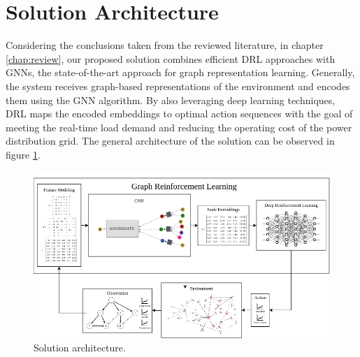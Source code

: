 \section{Solution Architecture} \label{sec:method-arch}

Considering the conclusions taken from the reviewed literature, in chapter \ref{chap:review}, our proposed solution combines efficient \acf{DRL} approaches with \acfp{GNN}, the state-of-the-art approach for graph representation learning. Generally, the system receives graph-based representations of the environment and encodes them using the \ac{GNN} algorithm. By also leveraging deep learning techniques, \ac{DRL} maps the encoded embeddings to optimal action sequences with the goal of meeting the real-time load demand and reducing the operating cost of the power distribution grid. The general architecture of the solution can be observed in figure \ref{fig:arch}.

\begin{figure}[H]
	\centering
	\includegraphics[width=0.85\linewidth]{./figures/arch.png}
	\caption{Solution architecture.}
	\label{fig:arch}
\end{figure}


